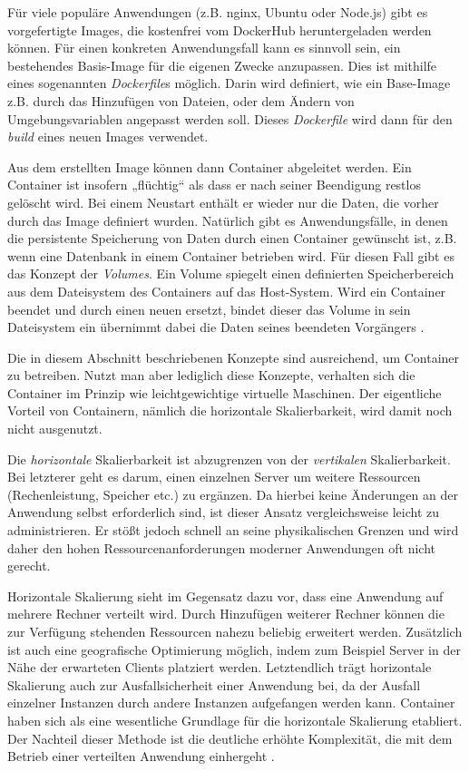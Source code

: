 \documentclass[11pt,a4paper]{article}
\begin{document}
Für viele populäre Anwendungen (z.B. nginx, Ubuntu oder Node.js) gibt es vorgefertigte Images, die kostenfrei vom DockerHub %
heruntergeladen werden können.
Für einen konkreten Anwendungsfall kann es sinnvoll sein, ein bestehendes Basis-Image für die eigenen Zwecke anzupassen.
Dies ist mithilfe eines sogenannten \emph{Dockerfile}s möglich. Darin wird definiert, wie ein Base-Image z.B. durch das Hinzufügen von Dateien,
oder dem Ändern von Umgebungsvariablen angepasst werden soll. Dieses \emph{Dockerfile} wird dann für den \emph{build}
eines neuen Images verwendet. \cite{kofler2021docker}

Aus dem erstellten Image können dann Container abgeleitet werden. Ein Container ist insofern „flüchtig“ als dass er nach seiner
Beendigung restlos gelöscht wird. Bei einem Neustart enthält er wieder nur die Daten, die vorher durch das Image definiert wurden.
Natürlich gibt es Anwendungsfälle, in denen die persistente Speicherung von Daten durch einen Container gewünscht ist, z.B. wenn
eine Datenbank in einem Container betrieben wird. Für diesen Fall gibt es das Konzept der \emph{Volumes}.
Ein Volume spiegelt einen definierten Speicherbereich aus dem Dateisystem des Containers auf das Host-System. 
Wird ein Container beendet und durch einen neuen ersetzt, bindet dieser das Volume in sein Dateisystem ein übernimmt 
dabei die Daten seines beendeten Vorgängers \cite{kofler2021docker}.

Die in diesem Abschnitt beschriebenen Konzepte sind ausreichend, um Container zu betreiben.
Nutzt man aber lediglich diese Konzepte, verhalten sich die Container im Prinzip wie leichtgewichtige virtuelle Maschinen.
Der eigentliche Vorteil von Containern, nämlich die horizontale Skalierbarkeit, wird damit noch nicht ausgenutzt.

Die \emph{horizontale} Skalierbarkeit ist abzugrenzen von der \emph{vertikalen} Skalierbarkeit. 
Bei letzterer geht es darum, einen einzelnen Server um weitere Ressourcen (Rechenleistung, Speicher etc.) zu ergänzen.
Da hierbei keine Änderungen an der Anwendung selbst erforderlich sind, ist dieser Ansatz vergleichsweise leicht
zu administrieren. Er stößt jedoch schnell an seine physikalischen Grenzen und wird daher den hohen 
Ressourcenanforderungen moderner Anwendungen oft nicht gerecht.

Horizontale Skalierung sieht im Gegensatz dazu vor, dass eine Anwendung
auf mehrere Rechner verteilt wird. Durch Hinzufügen weiterer Rechner können die zur Verfügung stehenden Ressourcen nahezu beliebig erweitert werden.
Zusätzlich ist auch eine geografische Optimierung möglich, indem zum Beispiel Server in der Nähe der erwarteten Clients platziert werden. 
Letztendlich trägt horizontale Skalierung auch zur Ausfallsicherheit einer Anwendung bei, da der Ausfall einzelner Instanzen durch andere Instanzen
aufgefangen werden kann.
Container haben sich als eine wesentliche Grundlage für die horizontale Skalierung etabliert. 
Der Nachteil dieser Methode ist die deutliche erhöhte Komplexität, 
die mit dem Betrieb einer verteilten Anwendung einhergeht \cite{Schmeling_Dargatz_2022}.
\end{document}
